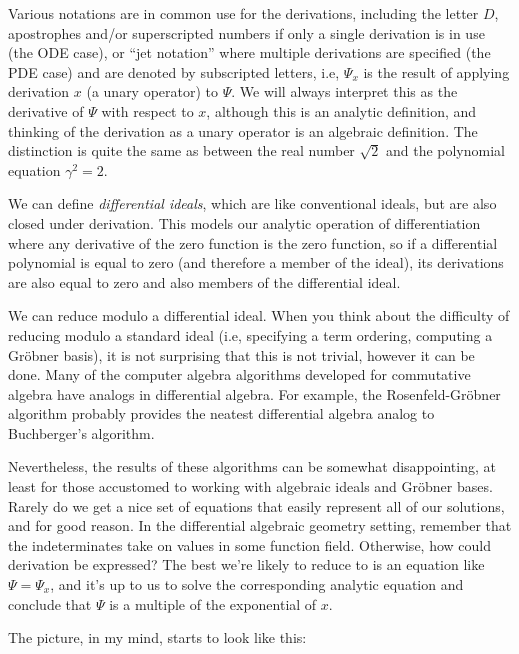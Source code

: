 \documentclass{article}
\begin{document}
Various notations are in common use for the derivations, including
the letter $D$, apostrophes and/or superscripted numbers if only
a single derivation is in use (the ODE case), or ``jet notation'' where multiple derivations are specified (the PDE case)
and are denoted by subscripted letters, i.e, $\Psi_x$
is the result of applying derivation $x$ (a unary operator)
to $\Psi$.  We will always interpret this as the derivative
of $\Psi$ with respect to $x$, although this is an analytic
definition, and thinking of the derivation as a unary operator
is an algebraic definition.  The distinction is quite the same
as between the real number $\sqrt{2}$ and the polynomial
equation $\gamma^2=2$.

We can define {\it differential ideals}, which are like conventional
ideals, but are also closed under derivation.  This models
our analytic operation of differentiation where any derivative
of the zero function is the zero function, so if a differential
polynomial is equal to zero (and therefore a member of the ideal),
its derivations are also equal to zero and also members of the
differential ideal.

We can reduce modulo a differential ideal.  When you think about the difficulty
of reducing modulo a standard ideal (i.e, specifying a term ordering,
computing a Gr\"obner basis), it is not surprising that this is
not trivial, however it can be done.
Many of the computer algebra algorithms developed for commutative algebra have analogs
in differential algebra.  For example, the Rosenfeld-Gr\"obner algorithm probably
provides the neatest differential algebra analog to Buchberger's algorithm.

Nevertheless, the results of these algorithms can be somewhat disappointing,
at least for those accustomed to working with algebraic ideals and Gr\"obner bases.
Rarely do we get a nice set of equations that easily represent all of our solutions,
and for good reason.  In the differential algebraic geometry setting, remember that the indeterminates
take on values in some function field.  Otherwise, how could derivation be expressed?
The best we're likely to reduce to is an equation like $\Psi=\Psi_x$, and it's up to us
to solve the corresponding analytic equation and conclude that $\Psi$ is a multiple of the exponential of $x$.

The picture, in my mind, starts to look like this:
\end{document}
